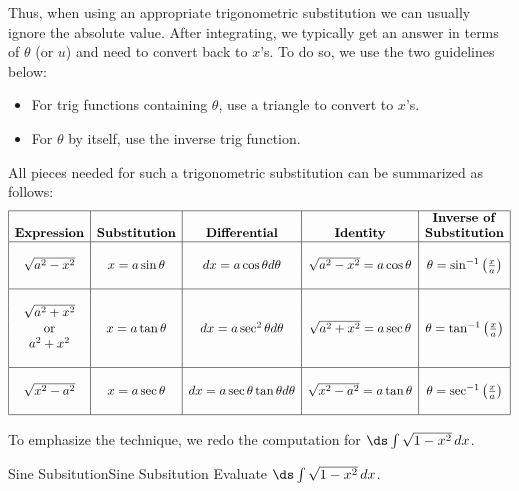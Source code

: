 Thus, when using an appropriate trigonometric substitution we can usually ignore the absolute value. 
After integrating, we typically get an answer in terms of $\theta$ (or $u$) and need to convert back to $x$'s.
To do so, we use the two guidelines below:
\begin{itemize}
	\item For trig functions containing $\theta$, use a triangle to convert to $x$'s.
	\item For $\theta$ by itself, use the inverse trig function.
\end{itemize}

All pieces needed for such a trigonometric substitution can be summarized as follows:
\[\begin{array}{|c|c|c|c|c|}\hline	%
		&	&	&	&	\text{\textbf{Inverse of}}	\\
\text{\textbf{Expression}}	&	\text{\textbf{Substitution}}	&	\text{\textbf{Differential}}	&	\text{\textbf{Identity}}	&	\text{\textbf{Substitution}}	\\	\hline
~	&	~	&	~	&	~	&	~	\\
\sqrt{a^2-x^2}	&	x=a\sin\theta	&	dx=a\cos\theta d\theta	&	\sqrt{a^2-x^2}=a\cos\theta	&	\theta=\sin^{-1}\left(\frac{x}{a}\right)	\\
~	&	~	&	~	&	~	&	~	\\	\hline
~	&	~	&	~	&	~	&	~	\\
\sqrt{a^2+x^2}	&	&	&	&	\\
 \text{or} 	&	x=a\tan\theta	&	dx=a\sec^2\theta d\theta	&	\sqrt{a^2+x^2}=a\sec\theta	&	\theta=\tan^{-1}\left(\frac{x}{a}\right)	\\
a^2+x^2 	&	&	&	&	\\
~	&	~	&	~	&	~	&	~	\\	\hline
~	&	~	&	~	&	~	&	~	\\
\sqrt{x^2-a^2}	&	x=a\sec\theta	&	dx=a\sec\theta\tan\theta d\theta	&	\sqrt{x^2-a^2}=a\tan\theta	&	\theta=\sec^{-1}\left(\frac{x}{a}\right)	\\
~	&	~	&	~	&	~	&	~	\\	\hline
\end{array}\]

To emphasize the technique, we redo the computation for $\ds\int \sqrt{1-x^2}\,dx$.

\begin{example}{Sine Subsitution}{Sine Subsitution}
Evaluate $\ds\int \sqrt{1-x^2}\,dx$. 
\end{example}

